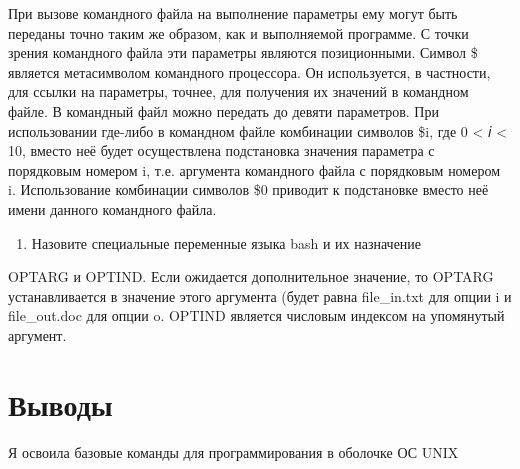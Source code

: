 При вызове командного файла на выполнение параметры ему могут быть
переданы точно таким же образом, как и выполняемой программе. С точки
зрения командного файла эти параметры являются позиционными. Символ \$
является метасимволом командного процессора. Он используется, в
частности, для ссылки на параметры, точнее, для получения их значений в
командном файле. В командный файл можно передать до девяти параметров.
При использовании где-либо в командном файле комбинации символов \$i,
где 0 \textless{} 𝑖 \textless{} 10, вместо неё будет осуществлена
подстановка значения параметра с порядковым номером i, т.е. аргумента
командного файла с порядковым номером i. Использование комбинации
символов \$0 приводит к подстановке вместо неё имени данного командного
файла.

\begin{enumerate}
\def\labelenumi{\arabic{enumi}.}
\setcounter{enumi}{14}
\tightlist
\item
  Назовите специальные переменные языка bash и их назначение
\end{enumerate}

OPTARG и OPTIND. Если ожидается дополнительное значение, то OPTARG
устанавливается в значение этого аргумента (будет равна file\_in.txt для
опции i и file\_out.doc для опции o. OPTIND является числовым индексом
на упомянутый аргумент.

\hypertarget{ux432ux44bux432ux43eux434ux44b}{%
\chapter{Выводы}\label{ux432ux44bux432ux43eux434ux44b}}

Я освоила базовые команды для программирования в оболочке ОС UNIX
